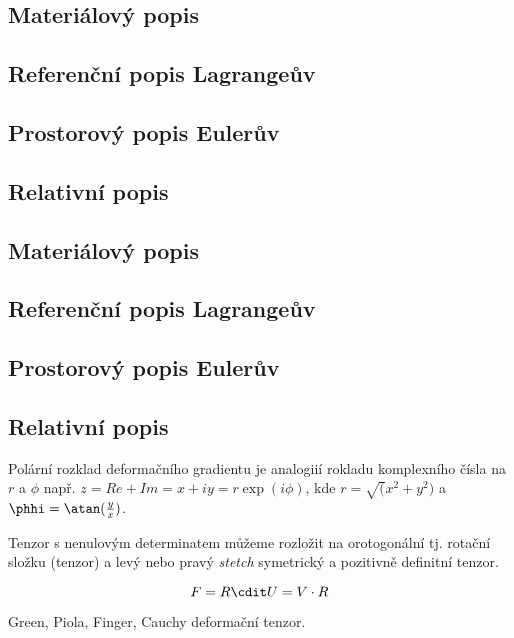 \subsection{Materiálový popis}
\subsection{Referenční popis Lagrangeův}
\subsection{Prostorový popis Eulerův}
\subsection{Relativní popis}

\subsection{Materiálový popis}
\subsection{Referenční popis Lagrangeův}
\subsection{Prostorový popis Eulerův}
\subsection{Relativní popis}


Polární rozklad deformačního gradientu je analogiií rokladu komplexního čísla na $r$ a $\phi$ např. $z = Re + Im = x + iy = r \exp(i\phi)$, kde $r = \sqrt(x^2 + y^2)$ a $\phhi = \atan(\frac{y}{x})$.

Tenzor s nenulovým determinatem můžeme rozložit na orotogonální tj. rotační složku (tenzor) a levý nebo pravý \textit{stetch} symetrický  a pozitivně definitní tenzor.

$$
    F = R \cdit U = V \cdot R
$$

Green, Piola, Finger, Cauchy deformační tenzor.

